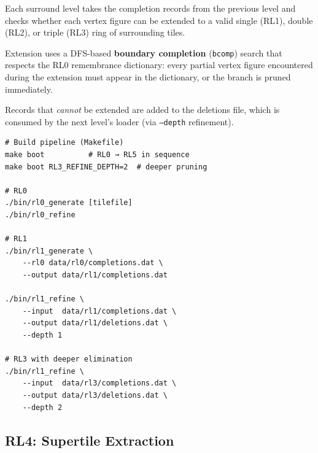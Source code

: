 \documentclass[10pt,a4paper]{article}
\let\polysubsection\subsection
\renewcommand\subsection{\needspace{0.12\textheight}\polysubsection}
\newcommand{\code}[1]{\texttt{\small #1}}
\newcommand{\file}[1]{\texttt{\footnotesize #1}}
\begin{document}
\begin{tcolorbox}[dualbox, title=RL1–RL3 — Boundary Completion Filters — \file{src/rl1/} \ldots \file{src/rl3/}]
  Each surround level takes the completion records from the previous
  level and checks whether each vertex figure can be extended to a
  valid single (RL1), double (RL2), or triple (RL3) ring of surrounding
  tiles.

  Extension uses a DFS-based \textbf{boundary completion} (\code{bcomp})
  search that respects the RL0 remembrance dictionary: every partial
  vertex figure encountered during the extension must appear in the
  dictionary, or the branch is pruned immediately.

  Records that \emph{cannot} be extended are added to the
  deletions file, which is consumed by the next level's loader
  (via \code{--depth} refinement).

\tcblower
\begin{verbatim}
# Build pipeline (Makefile)
make boot          # RL0 → RL5 in sequence
make boot RL3_REFINE_DEPTH=2  # deeper pruning

# RL0
./bin/rl0_generate [tilefile]
./bin/rl0_refine

# RL1
./bin/rl1_generate \
    --rl0 data/rl0/completions.dat \
    --output data/rl1/completions.dat

./bin/rl1_refine \
    --input  data/rl1/completions.dat \
    --output data/rl1/deletions.dat \
    --depth 1

# RL3 with deeper elimination
./bin/rl1_refine \
    --input  data/rl3/completions.dat \
    --output data/rl3/deletions.dat \
    --depth 2
\end{verbatim}
\end{tcolorbox}

\subsection{RL4: Supertile Extraction}
\end{document}
